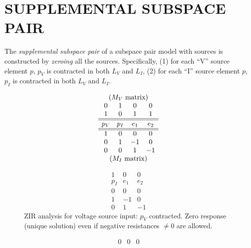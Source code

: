 \documentclass{article}
\newcommand{\extra}[1]{{\small{#1}}}
\begin{document}
\section{SUPPLEMENTAL SUBSPACE PAIR}

The \textit{supplemental subspace pair} of a subspace pair model
with sources is constructed by \textit{zeroing} all the sources.
Specifically, (1) for each ``V'' source element $p$, $p_V$ is 
contracted in both $L_V$ and $L_I$,
(2) for each ``I'' source element $p$, 
$p_I$ is contracted in both $L_V$ and $L_I$.


\extra{
\begin{figure}[htb]

\begin{minipage}[c]{.48\linewidth}
  \centering
 \centerline{}
\end{minipage}
%
\hfill
\begin{minipage}[c]{.48\linewidth}
\[
\begin{array}{cccc}
\multicolumn{4}{c}{\mbox{($M_V$ matrix)}} \\
0   &  1  &  0  &  0  \\
1   &  0  &  1  &  1  \\ \hline \hline
p_V & p_I & e_1 & e_2 \\ \hline \hline
1   &  0  &  0  &  0  \\
0   &  1  & -1  &  0  \\
0   &  0  &  1  &  -1 \\
\multicolumn{4}{c}{\mbox{($M_I$ matrix)}} \\
\end{array}
\]
\end{minipage}
%
\begin{minipage}[b]{.48\linewidth}
\[
\begin{array}{ccc}
  1  &  0  &  0  \\ \hline
 p_I & e_1 & e_2 \\ \hline
  0  &  0  &  0  \\
  1  & -1  &  0  \\
  0  &  1  &  -1
\end{array}
\]
ZIR analysis for voltage source input:
$p_V$ contracted.  Zero response (unique solution) even if
negative resistances $\neq 0$ are allowed.
\end{minipage}
\hfill
\begin{minipage}[b]{.48\linewidth}
\[
\begin{array}{ccc}
0   &  0  &  0  \\

\end{array}\]
\end{minipage}
\end{figure}}
\end{document}
